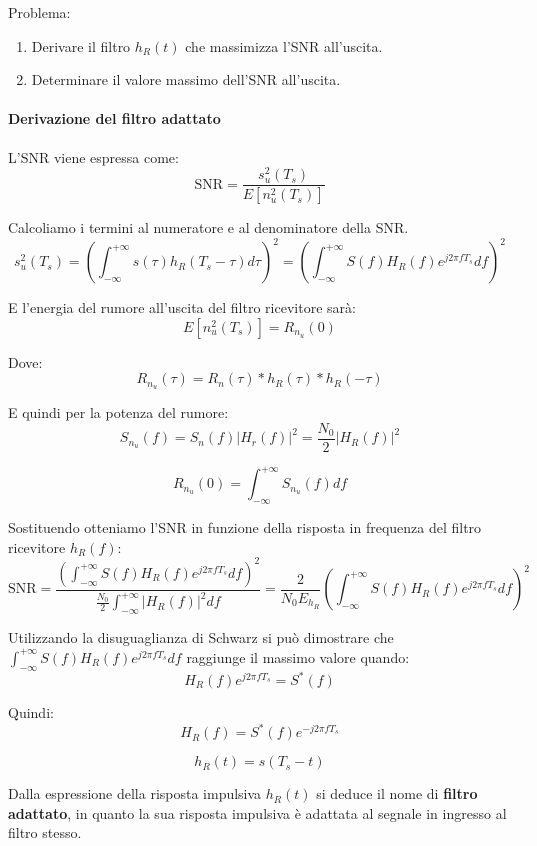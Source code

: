 \documentclass{article}
\begin{document}
Problema:
\begin{enumerate}
    \item Derivare il filtro \( h_R(t) \) che massimizza l'SNR all'uscita.
    \item Determinare il valore massimo dell'SNR all'uscita.
\end{enumerate}


\paragraph*{Derivazione del filtro adattato}

L'SNR viene espressa come:
\[
\text{SNR} = \frac{s_u^2(T_s)}{E[n_u^2(T_s)]}
\]

Calcoliamo i termini al numeratore e al denominatore della SNR.
\[
s_u^2(T_s) = \left( \int_{-\infty}^{+\infty} s(\tau) h_R(T_s - \tau) d\tau \right)^2 = \left( \int_{-\infty}^{+\infty} S(f) H_R(f) e^{j2\pi fT_s} df \right)^2
\]

E l'energia del rumore all'uscita del filtro ricevitore sarà:
\[
E[n_u^2(T_s)] = R_{n_u}(0)
\]

Dove:
\[
R_{n_u}(\tau) = R_n(\tau) \ast h_R(\tau) \ast h_R(-\tau)
\]

E quindi per la potenza del rumore:
\[
S_{n_u}(f) = S_n(f) \left| H_r(f) \right|^2 = \frac{N_0}{2} \left| H_R(f) \right|^2
\]

\[
R_{n_u}(0) = \int_{-\infty}^{+\infty} S_{n_u}(f) df
\]

Sostituendo otteniamo l'SNR in funzione della risposta in frequenza del filtro ricevitore \( h_R(f) \):
\[
\text{SNR} = \frac{\left( \int_{-\infty}^{+\infty} S(f) H_R(f) e^{j2\pi fT_s} df \right)^2}{\frac{N_0}{2} \int_{-\infty}^{+\infty} \left| H_R(f) \right|^2 df} = \frac{2}{N_0 E_{h_R}} \left( \int_{-\infty}^{+\infty} S(f) H_R(f) e^{j2\pi fT_s} df \right)^2
\]

Utilizzando la disuguaglianza di Schwarz si può dimostrare che $\int_{-\infty}^{+\infty} S(f) H_R(f) e^{j2\pi fT_s} df$ raggiunge il massimo valore quando:
\[
H_R(f) e^{j2\pi fT_s} = S^*(f)
\]

Quindi:
\[
H_R(f) = S^*(f) e^{-j2\pi fT_s}
\]

\[
\boxed{h_R(t) = s(T_s - t)}
\]

Dalla espressione della risposta impulsiva \( h_R(t) \) si deduce il nome di \textbf{filtro adattato}, in quanto la sua risposta impulsiva è adattata al segnale in ingresso al filtro stesso.
\end{document}
